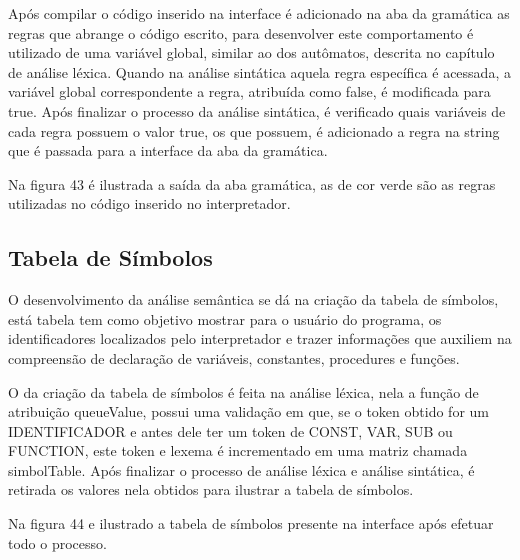 \documentclass[12pt,oneside,a4paper,chapter=TITLE,section=TITLE,sumario=tradicional]{abntex2}
\begin{document}
Após compilar o código inserido na interface é adicionado na aba da gramática as regras que abrange o código escrito, para desenvolver este comportamento é utilizado de uma variável global, similar ao dos autômatos, descrita no capítulo de análise léxica. Quando na análise sintática aquela regra específica é acessada, a variável global correspondente a regra, atribuída como false, é modificada para true. Após finalizar o processo da análise sintática, é verificado quais variáveis de cada regra possuem o valor true, os que possuem, é adicionado a regra na string que é passada para a interface da aba da gramática. 

Na figura 43 é ilustrada a saída da aba gramática, as de cor verde são as regras utilizadas no código inserido no interpretador. 

\begin{figure}[htb]
\end{figure} 

\subsection{Tabela de Símbolos}
\label{subsec:tabeladesimbolos}

O desenvolvimento da análise semântica se dá na criação da tabela de símbolos, está tabela tem como objetivo mostrar para o usuário do programa, os identificadores localizados pelo interpretador e trazer informações que auxiliem na compreensão de declaração de variáveis, constantes, procedures e funções.

O da criação da tabela de símbolos é feita na análise léxica, nela a função de atribuição queueValue, possui uma validação em que, se o token obtido for um IDENTIFICADOR e antes dele ter um token de CONST, VAR, SUB ou FUNCTION, este token e lexema é incrementado em uma matriz chamada simbolTable. Após finalizar o processo de análise léxica e análise sintática, é retirada os valores nela obtidos para ilustrar a tabela de símbolos.

Na figura 44 e ilustrado a tabela de símbolos presente na interface após efetuar todo o processo. 

\begin{figure}[htb]
\end{figure} 
\end{document}

